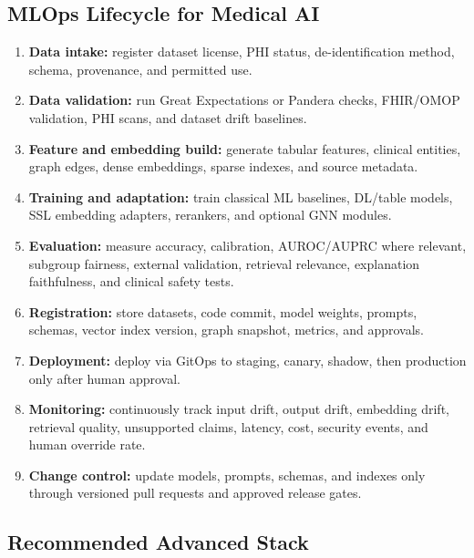 \subsection{MLOps Lifecycle for Medical AI}

\begin{enumerate}
  \item \textbf{Data intake:} register dataset license, PHI status, de-identification method, schema, provenance, and permitted use.
  \item \textbf{Data validation:} run Great Expectations or Pandera checks, FHIR/OMOP validation, PHI scans, and dataset drift baselines.
  \item \textbf{Feature and embedding build:} generate tabular features, clinical entities, graph edges, dense embeddings, sparse indexes, and source metadata.
  \item \textbf{Training and adaptation:} train classical ML baselines, DL/table models, SSL embedding adapters, rerankers, and optional GNN modules.
  \item \textbf{Evaluation:} measure accuracy, calibration, AUROC/AUPRC where relevant, subgroup fairness, external validation, retrieval relevance, explanation faithfulness, and clinical safety tests.
  \item \textbf{Registration:} store datasets, code commit, model weights, prompts, schemas, vector index version, graph snapshot, metrics, and approvals.
  \item \textbf{Deployment:} deploy via GitOps to staging, canary, shadow, then production only after human approval.
  \item \textbf{Monitoring:} continuously track input drift, output drift, embedding drift, retrieval quality, unsupported claims, latency, cost, security events, and human override rate.
  \item \textbf{Change control:} update models, prompts, schemas, and indexes only through versioned pull requests and approved release gates.
\end{enumerate}

\subsection{Recommended Advanced Stack}

